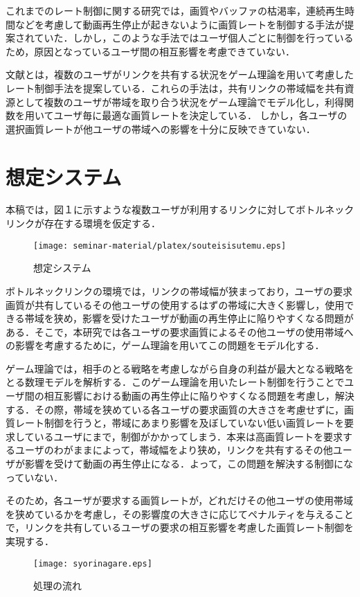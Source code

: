 \documentclass[rinkou,a4paper,uplatex]{ieicej}
\begin{document}
これまでのレート制御に関する研究では，画質やバッファの枯渇率，連続再生時間などを考慮して動画再生停止が起きないように画質レートを制御する手法が提案されていた．しかし，このような手法ではユーザ個人ごとに制御を行っているため，原因となっているユーザ間の相互影響を考慮できていない．

文献\cite{kison}と\cite{motomoto}は，複数のユーザがリンクを共有する状況をゲーム理論を用いて考慮したレート制御手法を提案している．これらの手法は，共有リンクの帯域幅を共有資源として複数のユーザが帯域を取り合う状況をゲーム理論でモデル化し，利得関数を用いてユーザ毎に最適な画質レートを決定している．
しかし，各ユーザの選択画質レートが他ユーザの帯域への影響を十分に反映できていない．


\section{想定システム}
本稿では，図１に示すような複数ユーザが利用するリンクに対してボトルネックリンクが存在する環境を仮定する．
\begin{figure}[hh]
\centering
\texttt{[image: seminar-material/platex/souteisisutemu.eps]}
\caption{想定システム}\label{tsubame}
\end{figure}
ボトルネックリンクの環境では，リンクの帯域幅が狭まっており，ユーザの要求画質が共有しているその他ユーザの使用するはずの帯域に大きく影響し，使用できる帯域を狭め，影響を受けたユーザが動画の再生停止に陥りやすくなる問題がある．そこで，本研究では各ユーザの要求画質によるその他ユーザの使用帯域への影響を考慮するために，ゲーム理論を用いてこの問題をモデル化する．

ゲーム理論では，相手のとる戦略を考慮しながら自身の利益が最大となる戦略をとる数理モデルを解析する．このゲーム理論を用いたレート制御を行うことでユーザ間の相互影響における動画の再生停止に陥りやすくなる問題を考慮し，解決する．その際，帯域を狭めている各ユーザの要求画質の大きさを考慮せずに，画質レート制御を行うと，帯域にあまり影響を及ぼしていない低い画質レートを要求しているユーザにまで，制御がかかってしまう．本来は高画質レートを要求するユーザのわがままによって，帯域幅をより狭め，リンクを共有するその他ユーザが影響を受けて動画の再生停止になる．よって，この問題を解決する制御になっていない．

そのため，各ユーザが要求する画質レートが，どれだけその他ユーザの使用帯域を狭めているかを考慮し，その影響度の大きさに応じてペナルティを与えることで，リンクを共有しているユーザの要求の相互影響を考慮した画質レート制御を実現する．

\begin{figure}[hh]
\centering
\texttt{[image: syorinagare.eps]}
\caption{処理の流れ}\label{tsubame}
\end{figure}
\end{document}

